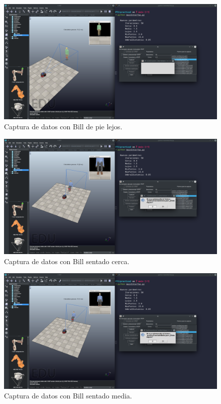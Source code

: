 \documentclass[12pt, spanish]{article}
\begin{document}
\begin{figure}[H]
    \centering
    \includegraphics[width=\textwidth]{captura_lejos.png}
    \caption{Captura de datos con Bill de pie lejos.}
\end{figure}

\begin{figure}[H]
    \centering
    \includegraphics[width=\textwidth]{sentado_cerca.png}
    \caption{Captura de datos con Bill sentado cerca.}
\end{figure}

\begin{figure}[H]
    \centering
    \includegraphics[width=\textwidth]{sentado_media.png}
    \caption{Captura de datos con Bill sentado media.}
\end{figure}
\end{document}
